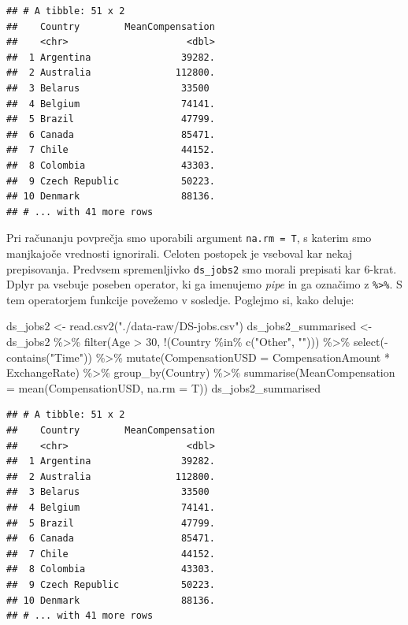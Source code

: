 \documentclass[
]{book}
\newenvironment{Shaded}{\begin{snugshade}}{\end{snugshade}}
\newcommand{\AttributeTok}[1]{\textcolor[rgb]{0.77,0.63,0.00}{#1}}
\newcommand{\DecValTok}[1]{\textcolor[rgb]{0.00,0.00,0.81}{#1}}
\newcommand{\FunctionTok}[1]{\textcolor[rgb]{0.00,0.00,0.00}{#1}}
\newcommand{\NormalTok}[1]{#1}
\newcommand{\OtherTok}[1]{\textcolor[rgb]{0.56,0.35,0.01}{#1}}
\newcommand{\SpecialCharTok}[1]{\textcolor[rgb]{0.00,0.00,0.00}{#1}}
\newcommand{\StringTok}[1]{\textcolor[rgb]{0.31,0.60,0.02}{#1}}
\begin{document}
\begin{verbatim}
## # A tibble: 51 x 2
##    Country        MeanCompensation
##    <chr>                     <dbl>
##  1 Argentina                39282.
##  2 Australia               112800.
##  3 Belarus                  33500 
##  4 Belgium                  74141.
##  5 Brazil                   47799.
##  6 Canada                   85471.
##  7 Chile                    44152.
##  8 Colombia                 43303.
##  9 Czech Republic           50223.
## 10 Denmark                  88136.
## # ... with 41 more rows
\end{verbatim}

Pri računanju povprečja smo uporabili argument \texttt{na.rm\ =\ T}, s katerim smo manjkajoče vrednosti ignorirali. Celoten postopek je vseboval kar nekaj prepisovanja. Predvsem spremenljivko \texttt{ds\_jobs2} smo morali prepisati kar 6-krat. Dplyr pa vsebuje poseben operator, ki ga imenujemo \emph{pipe} in ga označimo z \texttt{\%\textgreater{}\%}. S tem operatorjem funkcije povežemo v sosledje. Poglejmo si, kako deluje:

\begin{Shaded}
\begin{Highlighting}[]
\NormalTok{ds\_jobs2 }\OtherTok{\textless{}{-}} \FunctionTok{read.csv2}\NormalTok{(}\StringTok{"./data{-}raw/DS{-}jobs.csv"}\NormalTok{)}
\NormalTok{ds\_jobs2\_summarised }\OtherTok{\textless{}{-}}\NormalTok{ ds\_jobs2 }\SpecialCharTok{\%\textgreater{}\%}
  \FunctionTok{filter}\NormalTok{(Age }\SpecialCharTok{\textgreater{}} \DecValTok{30}\NormalTok{, }\SpecialCharTok{!}\NormalTok{(Country }\SpecialCharTok{\%in\%} \FunctionTok{c}\NormalTok{(}\StringTok{"Other"}\NormalTok{, }\StringTok{""}\NormalTok{))) }\SpecialCharTok{\%\textgreater{}\%}
  \FunctionTok{select}\NormalTok{(}\SpecialCharTok{{-}}\FunctionTok{contains}\NormalTok{(}\StringTok{"Time"}\NormalTok{)) }\SpecialCharTok{\%\textgreater{}\%}
  \FunctionTok{mutate}\NormalTok{(}\AttributeTok{CompensationUSD =}\NormalTok{ CompensationAmount }\SpecialCharTok{*}\NormalTok{ ExchangeRate) }\SpecialCharTok{\%\textgreater{}\%}
  \FunctionTok{group\_by}\NormalTok{(Country) }\SpecialCharTok{\%\textgreater{}\%}
  \FunctionTok{summarise}\NormalTok{(}\AttributeTok{MeanCompensation =} \FunctionTok{mean}\NormalTok{(CompensationUSD, }\AttributeTok{na.rm =}\NormalTok{ T))}
\NormalTok{ds\_jobs2\_summarised}
\end{Highlighting}
\end{Shaded}

\begin{verbatim}
## # A tibble: 51 x 2
##    Country        MeanCompensation
##    <chr>                     <dbl>
##  1 Argentina                39282.
##  2 Australia               112800.
##  3 Belarus                  33500 
##  4 Belgium                  74141.
##  5 Brazil                   47799.
##  6 Canada                   85471.
##  7 Chile                    44152.
##  8 Colombia                 43303.
##  9 Czech Republic           50223.
## 10 Denmark                  88136.
## # ... with 41 more rows
\end{verbatim}
\end{document}

